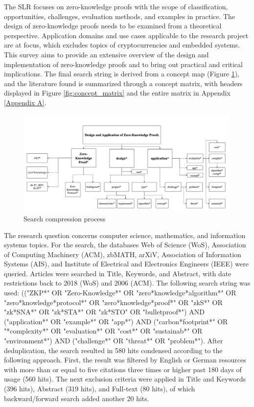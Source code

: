 The SLR focuses on zero-knowledge proofs with the scope of classification, opportunities, challenges, evaluation methods, and examples in practice. The design of zero-knowledge proofs needs to be examined from a theoretical perspective. Application domains and use cases applicable to the research project are at focus, which excludes topics of cryptocurrencies and embedded systems. This survey aims to provide an extensive overview of the design and implementation of zero-knowledge proofs and to bring out practical and critical implications. The final search string is derived from a concept map (Figure \ref{fig:concept_map}), and the literature found is summarized through a concept matrix, with headers displayed in Figure \ref{fig:concept_matrix} and the entire matrix in Appendix \ref{Appendix A}.

\begin{figure}[hbt]
	\centering
		\includegraphics[width=0.99\textwidth]{Pictures/concept map.png}
	\caption{Search compression process}
	\label{fig:concept_map}
\end{figure}

The research question concerns computer science, mathematics, and information systems topics. For the search, the databases Web of Science (WoS), Association of Computing Machinery (ACM), zbMATH, arXiV, Association of Information Systems (AIS), and Institute of Electrical and Electronics Engineers (IEEE) were queried. Articles were searched in Title, Keywords, and Abstract, with date restrictions back to 2018 (WoS) and 2006 (ACM). The following search string was used: (("ZKP*" OR "Zero-Knowledge*" OR "zero*knowledge*algorithm*" OR "zero*knowledge*protocol*" OR "zero*knowledge*proof*" OR "zkS*" OR "zk*SNA*" OR "zk*STA*" OR "zk*STO" OR "bulletproof*") AND ("application*" OR "example*" OR "app*") AND ("carbon*footprint*" OR "*complexity*" OR "evaluation*" OR "cost*" OR "sustainab*" OR "environment*") AND ("challenge*" OR "threat*" OR "problem*"). After deduplication, the search resulted in 580 hits condensed according to the following approach. First, the result was filtered by English or German resources with more than or equal to five citations three times or higher past 180 days of usage (560 hits). The next exclusion criteria were applied in Title and Keywords (396 hits), Abstract (319 hits), and Full-text (80 hits), of which backward/forward search added another 20 hits. 


